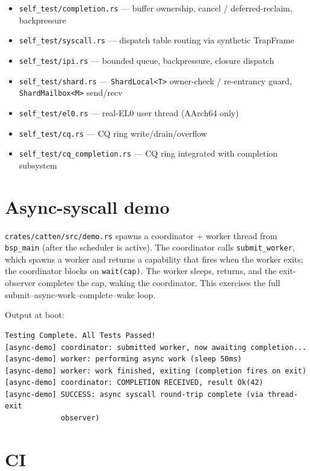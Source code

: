 \begin{itemize}
    \item \texttt{self\_test/completion.rs} --- buffer ownership, cancel /
        deferred-reclaim, backpressure
    \item \texttt{self\_test/syscall.rs} --- dispatch table routing via
        synthetic TrapFrame
    \item \texttt{self\_test/ipi.rs} --- bounded queue, backpressure,
        closure dispatch
    \item \texttt{self\_test/shard.rs} --- \texttt{ShardLocal<T>} owner-check
        / re-entrancy guard, \texttt{ShardMailbox<M>} send/recv
    \item \texttt{self\_test/el0.rs} --- real-EL0 user thread (AArch64 only)
    \item \texttt{self\_test/cq.rs} --- CQ ring write/drain/overflow
    \item \texttt{self\_test/cq\_completion.rs} --- CQ ring integrated with
        completion subsystem
\end{itemize}

\section{Async-syscall demo}

\texttt{crates/catten/src/demo.rs} spawns a coordinator + worker thread from
\texttt{bsp\_main} (after the scheduler is active). The coordinator calls
\texttt{submit\_worker}, which spawns a worker and returns a capability that
fires when the worker exits; the coordinator blocks on \texttt{wait(cap)}.
The worker sleeps, returns, and the exit-observer completes the cap, waking
the coordinator. This exercises the full submit--async-work--complete--wake
loop.

Output at boot:
\begin{verbatim}
Testing Complete. All Tests Passed!
[async-demo] coordinator: submitted worker, now awaiting completion...
[async-demo] worker: performing async work (sleep 50ms)
[async-demo] worker: work finished, exiting (completion fires on exit)
[async-demo] coordinator: COMPLETION RECEIVED, result Ok(42)
[async-demo] SUCCESS: async syscall round-trip complete (via thread-exit 
             observer)
\end{verbatim}

\section{CI}

